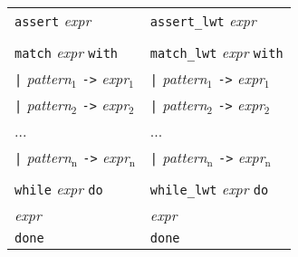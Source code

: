 \begin{tabular}{p{}p{}}
 {\tt assert} \emph{expr}                                                            & {\tt assert\_lwt} \emph{expr}                                                            \\
                                                                                  &                                                                                      \\
 {\tt match} \emph{expr} {\tt with}                                                  & {\tt match\_lwt} \emph{expr} {\tt with}                                                  \\
 \emph{ } {\tt |} \emph{pattern$_{\mbox{1}}$} {\tt ->} \emph{expr$_{\mbox{1}}$}                            & \emph{ } {\tt |} \emph{pattern$_{\mbox{1}}$} {\tt ->} \emph{expr$_{\mbox{1}}$}                                \\
 \emph{ } {\tt |} \emph{pattern$_{\mbox{2}}$} {\tt ->} \emph{expr$_{\mbox{2}}$}                            & \emph{ } {\tt |} \emph{pattern$_{\mbox{2}}$} {\tt ->} \emph{expr$_{\mbox{2}}$}                                \\
 \emph{ } ...                                                                        & \emph{ } ...                                                                            \\
 \emph{ } {\tt |} \emph{pattern$_{\mbox{n}}$} {\tt ->} \emph{expr$_{\mbox{n}}$}                            & \emph{ } {\tt |} \emph{pattern$_{\mbox{n}}$} {\tt ->} \emph{expr$_{\mbox{n}}$}                                \\
                                                                                  &                                                                                      \\
 {\tt while} \emph{expr} {\tt do}                                                    & {\tt while\_lwt} \emph{expr} {\tt do}                                                    \\
 \emph{ expr}                                                                        & \emph{ expr}                                                                            \\
 {\tt done}                                                                       & {\tt done}                                                                           \\
\end{tabular}

